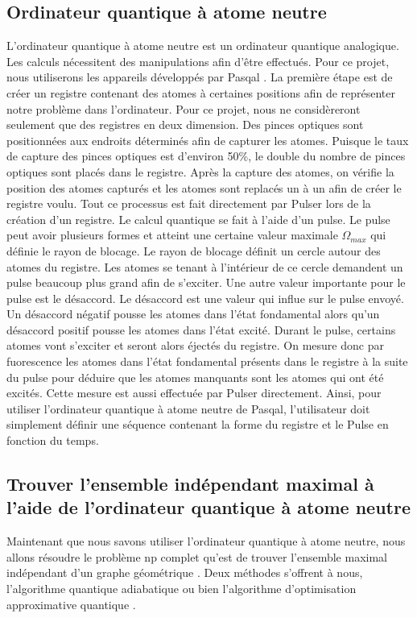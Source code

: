 \documentclass[11pt]{article}
\begin{document}
\subsection{Ordinateur quantique à atome neutre}
L'ordinateur quantique à atome neutre est un ordinateur quantique analogique. Les calculs nécessitent des manipulations afin d'être effectués. Pour ce projet, nous utiliserons les appareils développés par Pasqal \cite{browaeys_quantum_2019}. La première étape est de créer un registre contenant des atomes à certaines positions afin de représenter notre problème dans l'ordinateur. Pour ce projet, nous ne considèreront seulement que des registres en deux dimension. Des pinces optiques sont positionnées \cite{browaeys_pinces_2016} aux endroits déterminés afin de capturer les atomes. Puisque le taux de capture des pinces optiques est d'environ 50\%, le double du nombre de pinces optiques sont placés dans le registre. Après la capture des atomes, on vérifie la position des atomes capturés et les atomes sont replacés un à un afin de créer le registre voulu. Tout ce processus est fait directement par Pulser \cite{silverio_pulser_2022} lors de la création d'un registre. Le calcul quantique se fait à l'aide d'un pulse. Le pulse peut avoir plusieurs formes et atteint une certaine valeur maximale $\Omega_{max} $ qui définie le rayon de blocage. Le rayon de blocage définit un cercle autour des atomes du registre. Les atomes se tenant à l'intérieur de ce cercle demandent un pulse beaucoup plus grand afin de s'exciter. Une autre valeur importante pour le pulse est le désaccord. Le désaccord est une valeur qui influe sur le pulse envoyé. Un désaccord négatif pousse les atomes dans l'état fondamental alors qu'un désaccord positif pousse les atomes dans l'état excité. Durant le pulse, certains atomes vont s'exciter et seront alors éjectés du registre. On mesure donc par fuorescence les atomes dans l'état fondamental présents dans le registre à la suite du pulse pour déduire que les atomes manquants sont les atomes qui ont été excités. Cette mesure est aussi effectuée par Pulser directement. Ainsi, pour utiliser l'ordinateur quantique à atome neutre de Pasqal, l'utilisateur doit simplement définir une séquence contenant la forme du registre et le Pulse en fonction du temps. 


\subsection{Trouver l'ensemble indépendant maximal à l'aide de l'ordinateur quantique à atome neutre}
Maintenant que nous savons utiliser l'ordinateur quantique à atome neutre, nous allons résoudre le problème np complet \cite{tarjan_finding_1977} qu'est de trouver l'ensemble maximal indépendant d'un graphe géométrique \cite{dettmann_random_2016}. Deux méthodes s'offrent à nous, l'algorithme quantique adiabatique ou bien l'algorithme d'optimisation approximative quantique \cite{ebadi_quantum_2022}.
\end{document}
